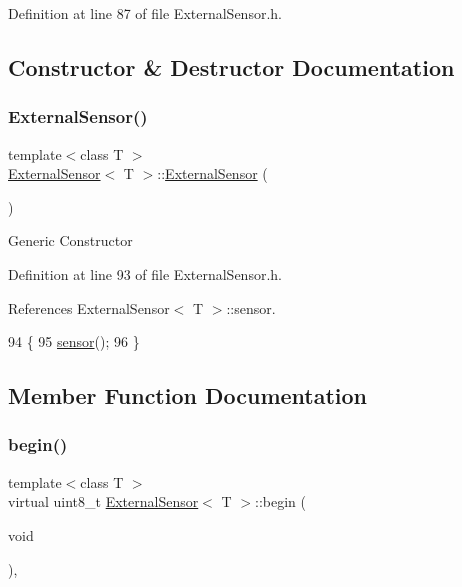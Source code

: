 Definition at line 87 of file External\+Sensor.\+h.



\subsection{Constructor \& Destructor Documentation}
\mbox{\label{classExternalSensor_a8b991447fba33253103d06198b838751}} 
\subsubsection{\texorpdfstring{External\+Sensor()}{ExternalSensor()}}
{\footnotesize\ttfamily template$<$class T $>$ \\
\hyperlink{classExternalSensor}{External\+Sensor}$<$ T $>$\+::\hyperlink{classExternalSensor}{External\+Sensor} (\begin{DoxyParamCaption}{ }\end{DoxyParamCaption})\hspace{0.3cm}{\ttfamily [inline]}}

Generic Constructor 

Definition at line 93 of file External\+Sensor.\+h.



References External\+Sensor$<$ T $>$\+::sensor.


\begin{DoxyCode}
94     \{
95         \hyperlink{classExternalSensor_a6e1f518119abe08c14b498ce24a7e1b3}{sensor}();
96     \}
\end{DoxyCode}


\subsection{Member Function Documentation}
\mbox{\label{classExternalSensor_ab6fe1379d55b656a048e0fba1e0a32e6}} 
\subsubsection{\texorpdfstring{begin()}{begin()}}
{\footnotesize\ttfamily template$<$class T $>$ \\
virtual uint8\+\_\+t \hyperlink{classExternalSensor}{External\+Sensor}$<$ T $>$\+::begin (\begin{DoxyParamCaption}\item[{void}]{ }\end{DoxyParamCaption})\hspace{0.3cm}{\ttfamily [inline]}, {\ttfamily [virtual]}}


